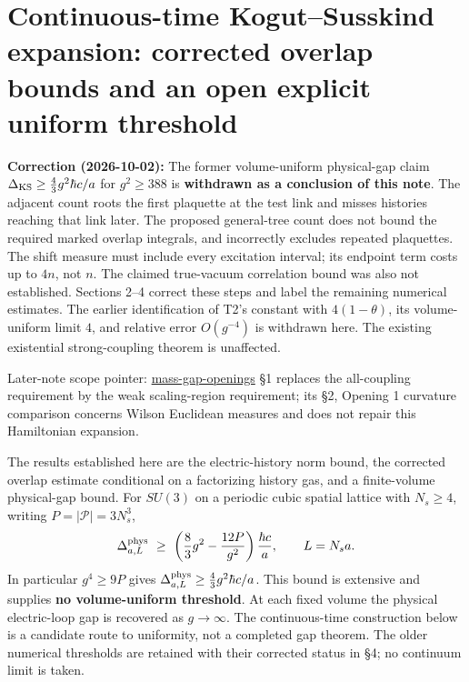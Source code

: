 \documentclass[11pt,a4paper]{article}
\begin{document}
\hypertarget{continuous-time-kogutsusskind-expansion-corrected-overlap-bounds-and-an-open-explicit-uniform-threshold}{%
\section{Continuous-time Kogut--Susskind expansion: corrected overlap
bounds and an open explicit uniform
threshold}\label{continuous-time-kogutsusskind-expansion-corrected-overlap-bounds-and-an-open-explicit-uniform-threshold}}

\textbf{Correction (2026-10-02):} The former volume-uniform physical-gap
claim \(\Delta_{\rm KS}\ge\frac43g^2\hbar c/a\) for \(g^2\ge388\) is
\textbf{withdrawn as a conclusion of this note}. The adjacent count
roots the first plaquette at the test link and misses histories reaching
that link later. The proposed general-tree count does not bound the
required marked overlap integrals, and incorrectly excludes repeated
plaquettes. The shift measure must include every excitation interval;
its endpoint term costs up to \(4n\), not \(n\). The claimed true-vacuum
correlation bound was also not established. Sections 2--4 correct these
steps and label the remaining numerical estimates. The earlier
identification of T2's constant with \(4(1-\theta)\), its volume-uniform
limit \(4\), and relative error \(O(g^{-4})\) is withdrawn here. The
existing existential strong-coupling theorem is unaffected.

Later-note scope pointer: \href{mass-gap-openings.md}{mass-gap-openings}
§1 replaces the all-coupling requirement by the weak scaling-region
requirement; its §2, Opening 1 curvature comparison concerns Wilson
Euclidean measures and does not repair this Hamiltonian expansion.

The results established here are the electric-history norm bound, the
corrected overlap estimate conditional on a factorizing history gas, and
a finite-volume physical-gap bound. For \(SU(3)\) on a periodic cubic
spatial lattice with \(N_s\ge4\), writing \(P=|\mathcal P|=3N_s^3\),
\[\Delta^{\rm phys}_{a,L}\ \ge\ \left(\frac83g^2-\frac{12P}{g^2}\right)\frac{\hbar c}{a},
\qquad L=N_sa.\] In particular \(g^4\ge9P\) gives
\(\Delta^{\rm phys}_{a,L}\ge\frac43g^2\hbar c/a\). This bound is
extensive and supplies \textbf{no volume-uniform threshold}. At each
fixed volume the physical electric-loop gap is recovered as
\(g\to\infty\). The continuous-time construction below is a candidate
route to uniformity, not a completed gap theorem. The older numerical
thresholds are retained with their corrected status in §4; no continuum
limit is taken.
\end{document}
